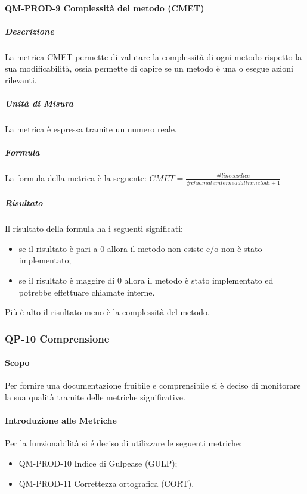 		\paragraph{QM-PROD-9 Complessità del metodo (CMET)}
			\subparagraph{Descrizione}
				La metrica CMET permette di valutare la complessità di ogni metodo rispetto la sua modificabilità, ossia permette di capire se un metodo è una  o esegue azioni rilevanti.
			\subparagraph{Unità di Misura}
				La metrica è espressa tramite un numero reale.
			\subparagraph{Formula}
				La formula della metrica è la seguente:
				\(
					CMET = \frac{\# linee codice}{\# chiamate interne ad altri metodi+1}
				\)
			\subparagraph{Risultato}
				Il risultato della formula ha i seguenti significati:
				\begin{itemize}
					\item se il risultato è pari a 0 allora il metodo non esiste e/o non è stato implementato;
					\item se il risultato è maggire di 0 allora il metodo è stato implementato ed potrebbe effettuare chiamate interne.
				\end{itemize}
				Più è alto il risultato meno è la complessità del metodo.

	\subsubsection{QP-10 Comprensione}
		\paragraph{Scopo}
			Per fornire una documentazione fruibile e comprensibile si è deciso di monitorare la sua qualità tramite delle metriche significative.
		\paragraph{Introduzione alle Metriche}
			Per la funzionabilità si é deciso di utilizzare le seguenti metriche:
			\begin{itemize}
				\item QM-PROD-10 Indice di Gulpease (GULP);
				\item QM-PROD-11 Correttezza ortografica (CORT).
			\end{itemize}
